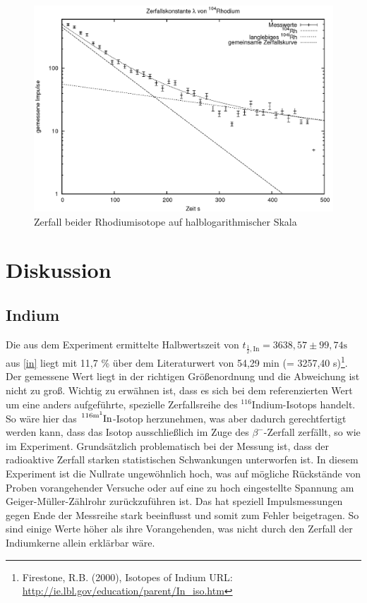 \begin{figure}[h]
	\includegraphics[width=1\textwidth]{pics/rhodium.png}
	\caption{Zerfall beider Rhodiumisotope auf halblogarithmischer Skala}
\end{figure}


\section{Diskussion}
\subsection{Indium}
Die aus dem Experiment ermittelte Halbwertszeit von $t_{\frac12,\text{In}} = 3638,57 \pm 99,74 \text{s}$ aus \eqref{in} liegt mit 11,7 \% über dem
Literaturwert von 54,29 min (= 3257,40 s)\footnote[1]{Firestone, R.B. (2000), Isotopes of Indium URL: \href{http://ie.lbl.gov/education/parent/In\_iso.htm}{http://ie.lbl.gov/education/parent/In\_iso.htm}}.
Der gemessene Wert liegt in der richtigen Größenordnung und die Abweichung ist nicht zu groß. Wichtig zu erwähnen ist, dass es
sich bei dem referenzierten Wert um eine anders aufgeführte, spezielle Zerfallsreihe des $^{116}$Indium-Isotops handelt. So wäre hier
das $\ce{^{116m^1}In}$-Isotop herzunehmen, was aber dadurch gerechtfertigt werden kann, dass das Isotop ausschließlich im Zuge des $\beta^-$-Zerfall
zerfällt, so wie im Experiment. Grundsätzlich problematisch bei der Messung ist, dass der radioaktive Zerfall starken statistischen Schwankungen unterworfen ist. In diesem Experiment
ist die Nullrate ungewöhnlich hoch, was auf mögliche Rückstände von Proben vorangehender Versuche oder auf eine zu hoch
eingestellte Spannung am Geiger-Müller-Zählrohr zurückzuführen ist. Das hat speziell Impulsmessungen gegen Ende der Messreihe
stark beeinflusst und somit zum Fehler beigetragen. So sind einige Werte höher als ihre Vorangehenden, was nicht durch den
Zerfall der Indiumkerne allein erklärbar wäre.


